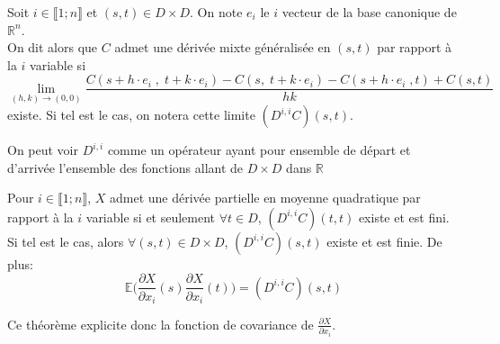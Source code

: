 \begin{definition}
  Soit $i \in \llbracket 1;n \rrbracket$ et $(s,t) \in D \times D $. On note $e_i$ le
  $i$ vecteur de la base canonique de $\mathbb{R}^n$.\\

  On dit alors que $C$ admet une dérivée mixte généralisée en $(s,t)$ par
  rapport à la $i$ variable si
  \begin{equation}
    \lim_{(h,k) \to (0,0)} \frac{C(s+h\cdot e_i\;,\;t+k\cdot e_i)-C(s,\;t+k\cdot e_i)-C(s+h\cdot e_i \;,t)+C(s,t)}{hk}
  \end{equation}
  existe. Si tel est le cas, on notera cette limite $(D^{i,i}C)(s,t)$.\\
\end{definition}

\begin{remark}
  On peut voir $D^{i,i}$ comme un opérateur ayant pour ensemble de départ et d'arrivée l'ensemble des fonctions allant de $D \times D$ dans $\mathbb{R}$
\end{remark}

\begin{theorem}
  Pour $i \in \llbracket 1;n \rrbracket$, $X$ admet une dérivée partielle en moyenne quadratique par rapport
  à la $i$ variable si et seulement $\forall t \in D$, $(D^{i,i}C)(t,t)$ existe et est fini. \\

  \noindent Si tel est le cas, alors $\forall (s,t) \in D \times D$, $(D^{i,i}C)(s,t)$ existe et est finie. De plus:
  \begin{equation} \mathbb{E}\biggl(\frac{\partial X}{\partial x_i} (s) \frac{\partial X}{\partial x_i} (t)\biggl) = (D^{i,i}C)(s,t) \end{equation}
\end{theorem}

\begin{remark}
  Ce théorème explicite donc la fonction de covariance de $\frac{\partial X}{\partial x_i}$.
\end{remark}

